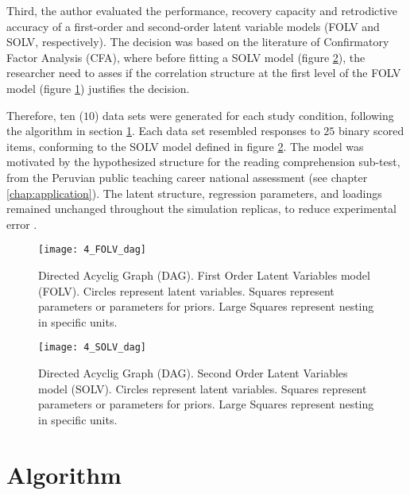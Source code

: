 Third, the author evaluated the performance, recovery capacity and retrodictive accuracy of a first-order and second-order latent variable models (FOLV and SOLV, respectively). The decision was based on the literature of Confirmatory Factor Analysis (CFA), where before fitting a SOLV model (figure \ref{fig:SOLV_model}), the researcher need to asses if the correlation structure at the first level of the FOLV model (figure \ref{fig:FOLV_model}) justifies the decision.

Therefore, ten ($10$) data sets were generated for each study condition, following the algorithm in section \ref{sect:algorithm}. Each data set resembled responses to $25$ binary scored items, conforming to the SOLV model defined in figure \ref{fig:SOLV_model}. The model was motivated by the hypothesized structure for the reading comprehension sub-test, from the Peruvian public teaching career national assessment (see chapter \ref{chap:application}). The latent structure, regression parameters, and loadings remained unchanged throughout the simulation replicas, to reduce experimental error \cite{Kieftenbeld_et_al_2012}. 
%
\begin{figure}[h]
	\centering
	\texttt{[image: 4\_FOLV\_dag]}
	\caption[Directed Acyclig Graph (DAG). First Order Latent Variables model (FOLV).]%
	{Directed Acyclig Graph (DAG). First Order Latent Variables model (FOLV). Circles represent latent variables. Squares represent parameters or parameters for priors. Large Squares represent nesting in specific units.}
	\label{fig:FOLV_model}
\end{figure}
%
\begin{figure}[h]
	\centering
	\texttt{[image: 4\_SOLV\_dag]}
	\caption[Directed Acyclic Graph (DAG). Second Order Latent Variables model (SOLV).]%
	{Directed Acyclig Graph (DAG). Second Order Latent Variables model (SOLV). Circles represent latent variables. Squares represent parameters or parameters for priors. Large Squares represent nesting in specific units.}
	\label{fig:SOLV_model}
\end{figure}


\section{Algorithm} \label{sect:algorithm}

